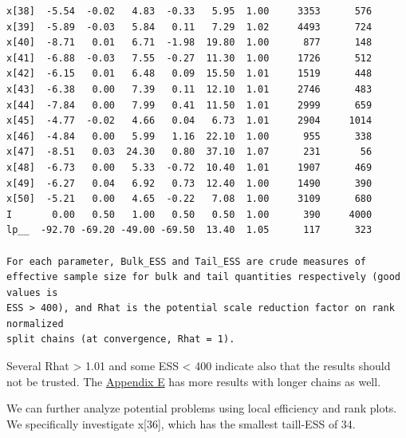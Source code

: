 \documentclass[american,]{article}
\begin{document}
\begin{verbatim}
x[38]  -5.54  -0.02   4.83  -0.33   5.95  1.00     3353      576
x[39]  -5.89  -0.03   5.84   0.11   7.29  1.02     4493      724
x[40]  -8.71   0.01   6.71  -1.98  19.80  1.00      877      148
x[41]  -6.88  -0.03   7.55  -0.27  11.30  1.00     1726      512
x[42]  -6.15   0.01   6.48   0.09  15.50  1.01     1519      448
x[43]  -6.38   0.00   7.39   0.11  12.10  1.01     2746      483
x[44]  -7.84   0.00   7.99   0.41  11.50  1.01     2999      659
x[45]  -4.77  -0.02   4.66   0.04   6.73  1.01     2904     1014
x[46]  -4.84   0.00   5.99   1.16  22.10  1.00      955      338
x[47]  -8.51   0.03  24.30   0.80  37.10  1.07      231       56
x[48]  -6.73   0.00   5.33  -0.72  10.40  1.01     1907      469
x[49]  -6.27   0.04   6.92   0.73  12.40  1.00     1490      390
x[50]  -5.21   0.00   4.65  -0.22   7.08  1.00     3109      680
I       0.00   0.50   1.00   0.50   0.50  1.00      390     4000
lp__  -92.70 -69.20 -49.00 -69.50  13.40  1.05      117      323

For each parameter, Bulk_ESS and Tail_ESS are crude measures of 
effective sample size for bulk and tail quantities respectively (good values is 
ESS > 400), and Rhat is the potential scale reduction factor on rank normalized
split chains (at convergence, Rhat = 1).
\end{verbatim}

Several Rhat \textgreater{} 1.01 and some ESS \textless{} 400 indicate
also that the results should not be trusted. The
\protect\hyperlink{AppendixE}{Appendix E} has more results with longer
chains as well.

We can further analyze potential problems using local efficiency and
rank plots. We specifically investigate x{[}36{]}, which has the
smallest taill-ESS of 34.
\end{document}
